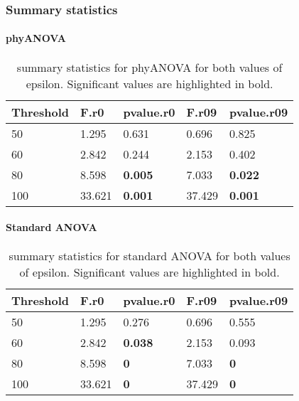 \documentclass[]{article}
\let\oldparagraph\paragraph
\renewcommand{\paragraph}[1]{\oldparagraph{#1}\mbox{}}
\begin{document}
\hypertarget{summary-statistics}{%
\subsubsection{Summary statistics}\label{summary-statistics}}

\hypertarget{phyanova-6}{%
\paragraph{phyANOVA}\label{phyanova-6}}

\begin{table}[H]

\caption{\label{tab:unnamed-chunk-30}summary statistics for phyANOVA for both values of epsilon. Significant values are highlighted in bold.}
\centering
\begin{tabular}{l|l|l|l|l}
\hline
Threshold & F.r0 & pvalue.r0 & F.r09 & pvalue.r09\\
\hline
50 & 1.295 & 0.631 & 0.696 & 0.825\\
\hline
60 & 2.842 & 0.244 & 2.153 & 0.402\\
\hline
80 & 8.598 & \textbf{0.005} & 7.033 & \textbf{0.022}\\
\hline
100 & 33.621 & \textbf{0.001} & 37.429 & \textbf{0.001}\\
\hline
\end{tabular}
\end{table}

\hypertarget{standard-anova-6}{%
\paragraph{Standard ANOVA}\label{standard-anova-6}}

\begin{table}[H]

\caption{\label{tab:unnamed-chunk-31}summary statistics for standard ANOVA for both values of epsilon. Significant values are highlighted in bold.}
\centering
\begin{tabular}{l|l|l|l|l}
\hline
Threshold & F.r0 & pvalue.r0 & F.r09 & pvalue.r09\\
\hline
50 & 1.295 & 0.276 & 0.696 & 0.555\\
\hline
60 & 2.842 & \textbf{0.038} & 2.153 & 0.093\\
\hline
80 & 8.598 & \textbf{0} & 7.033 & \textbf{0}\\
\hline
100 & 33.621 & \textbf{0} & 37.429 & \textbf{0}\\
\hline
\end{tabular}
\end{table}
\end{document}
